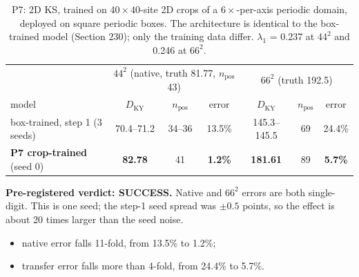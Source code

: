 \documentclass[11pt]{article}
\begin{document}
\begin{table}[h]
\centering
\small
\begin{tabular}{lcccccc}
\toprule
 & \multicolumn{3}{c}{$44^2$ (native, truth 81.77, $n_{\mathrm{pos}}$ 43)} & \multicolumn{3}{c}{$66^2$ (truth 192.5)} \\
model & $D_{\mathrm{KY}}$ & $n_{\mathrm{pos}}$ & error & $D_{\mathrm{KY}}$ & $n_{\mathrm{pos}}$ & error \\
\midrule
box-trained, step 1 (3 seeds) & 70.4--71.2 & 34--36 & 13.5\% & 145.3--145.5 & 69 & 24.4\% \\
\textbf{P7 crop-trained} (seed 0) & \textbf{82.78} & 41 & \textbf{1.2\%} & \textbf{181.61} & 89 & \textbf{5.7\%} \\
\bottomrule
\end{tabular}
\caption{P7: 2D KS, trained on $40\times40$-site 2D crops of a
$6\times$-per-axis periodic domain, deployed on square periodic boxes.
The architecture is identical to the box-trained model (Section 230);
only the training data differ. $\lambda_1$ = 0.237 at $44^2$ and 0.246
at $66^2$.}
\label{tab:p7_results}
\end{table}

\textbf{Pre-registered verdict: SUCCESS.} Native and $66^2$ errors are
both single-digit. This is one seed; the step-1 seed spread was
$\pm0.5$ points, so the effect is about 20 times larger than the seed
noise.
\begin{itemize}[leftmargin=*]
\item native error falls 11-fold, from 13.5\% to 1.2\%;
\item transfer error falls more than 4-fold, from 24.4\% to 5.7\%.
\end{itemize}
\end{document}
